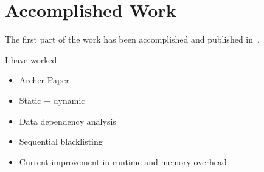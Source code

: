 \section{Accomplished Work}
\label{sec:accomplishedwork}

The first part of the work has been accomplished and published
in~\cite{Protze:2014:TPL:2688361.2688369, atzeni2016}.
%

%
I have worked 

\begin{itemize}
\item Archer Paper
\item Static + dynamic
\item Data dependency analysis
\item Sequential blacklisting
\item Current improvement in runtime and memory overhead
\end{itemize}

